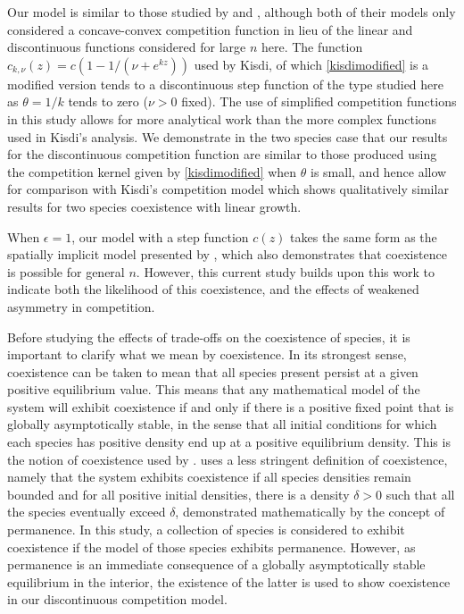 Our model is similar to those studied by \cite{law1997evolution} and \cite{kisdi1999evolutionary}, although both of their models only considered a concave-convex competition function in lieu of the linear and discontinuous functions considered for large $n$ here. The function $c_{k,\nu}(z) =  c(1-1/(\nu+e^{kz}))$ used by Kisdi, of which \eqref{kisdimodified} is a modified version tends to a discontinuous step function of the type studied here as $\theta = 1/k$ tends to zero ($\nu>0$ fixed). The use of simplified competition functions in this study allows for more analytical work than the more complex functions used in Kisdi's analysis. We demonstrate in the two species case that our results for the discontinuous competition function are similar to those produced using the competition kernel given by \eqref{kisdimodified} when $\theta$ is small, and hence allow for comparison with Kisdi's competition model which shows qualitatively similar results for two species coexistence with linear growth.

When $\epsilon=1$, our model with a step function $c(z)$ takes the same form as the spatially implicit model presented by \cite{klausmeier1998extinction}, which also demonstrates that coexistence is possible for general $n$. However, this current study builds upon this work to indicate both the likelihood of this coexistence, and the effects of weakened asymmetry in competition.

Before studying the effects of trade-offs on the coexistence of species, it is important to clarify what we mean by coexistence. In its strongest sense, coexistence can be taken to mean that all species present persist at a given positive equilibrium value. This means that any mathematical model of the system will exhibit coexistence if and only if there is a positive fixed point that is globally asymptotically stable, in the sense that all initial conditions for which each species has positive density end up at a positive equilibrium density. This is the notion of coexistence used by  \cite{strobeck1973n}. \cite{law1996permanence} uses a less stringent definition of coexistence, namely that the system exhibits coexistence if all species densities remain bounded and for all positive initial densities, there is a  density $\delta>0$ such that all the species eventually exceed $\delta$, demonstrated mathematically by the concept of permanence. In this study, a collection of species is considered to exhibit coexistence if the model of those species exhibits permanence. However, as permanence is an immediate consequence of a globally asymptotically stable equilibrium in the interior, the existence of the latter is used to show coexistence in our discontinuous competition model.

